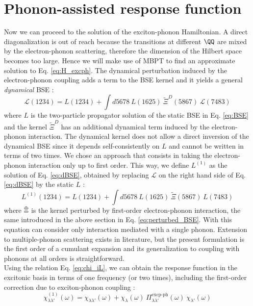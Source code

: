\section{Phonon-assisted response function}
Now we can proceed to the solution of the exciton-phonon Hamiltonian. A direct diagonalization is out of reach because the transitions at different $\QQ$ are mixed by the electron-phonon scattering, therefore the dimension of the Hilbert space becomes too large. Hence we will make use of \acrshort{MBPT} to find an approximate solution to Eq. \eqref{eq:H_excph}. The dynamical perturbation induced by the electron-phonon coupling adds a term to the \acrshort{BSE} kernel and it yields a general \textit{dynamical} \acrlong{BSE} :
\begin{equation}
    \mathcal{L}(1234) = L(1234) + \int d5678 \ L(1625) \ \tilde{\Xi}^{D}(5867) \ \mathcal{L}(7483) \label{eq:dBSE}
\end{equation}
where $L$ is the two-particle propagator solution of the static \acrshort{BSE} in Eq. \eqref{eq:BSE} and the kernel $\tilde{\Xi}^{D}$ has an additional dynamical term induced by the electron-phonon interaction. The dynamical kernel does not allow a direct inversion of the dynamical \acrshort{BSE} since it depends self-consistently on $L$ and cannot be written in terms of two times. We chose an approach that consists in taking the electron-phonon interaction only up to first order. This way, we define $L^{(1)}$ as the solution of Eq. \eqref{eq:dBSE}, obtained by replacing $\mathcal{L}$ on the right hand side of Eq. \ref{eq:dBSE} by the static $L$ :
\begin{equation}
    L^{(1)}(1234) = L(1234) + \int d5678 \ L(1625) \ \tilde{\Xi}(5867) \ L(7483)
\end{equation}
where $\Tilde{\Xi}$ is the kernel perturbed by first-order electron-phonon interaction, the same introduced in the above section in Eq. \eqref{eq:perturbed_BSE}. With this equation can consider only interaction mediated with a single phonon. Extension to multiple-phonon scattering exists in literature,\cite{perebeinos2008phonon} but the present formulation is the first order of a cumulant expansion and its generalization to coupling with phonons at all orders is straightforward.\cite{cudazzo2020first}\\
Using the relation Eq. \eqref{eq:chi_iL}, we can obtain the response function in the excitonic basis in terms of one frequency (or two times), including the first-order correction due to exciton-phonon coupling :
\begin{equation}
    \chi^{(1)}_{\lambda\lambda'}(\omega) = \chi_{\lambda\lambda'}(\omega) + \chi_{\lambda}(\omega) \ \Pi^{\text{excp-ph}}_{\lambda\lambda'} (\omega) \ \chi_{\lambda'}(\omega) \label{eq:chi_1}
\end{equation}
